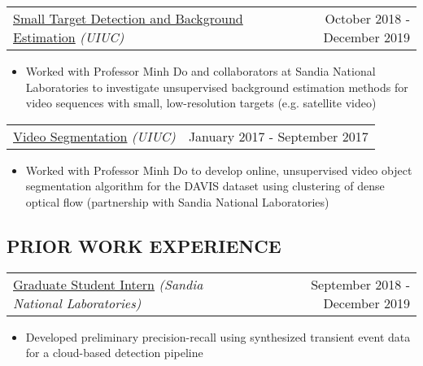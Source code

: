 \documentclass[10pt, letterpaper]{article}
\makeatletter
\newcommand{\headerrow}[2]
{\begin{tabular*}{\linewidth}{l@{\extracolsep{\fill}}r}
	#1 &
	#2 \\
\end{tabular*}}
\newcommand{\sansserif}{\cabin}
\makeatother
\begin{document}
\headerrow
	{\uline{Small Target Detection and Background Estimation} \textit{(UIUC)}}
	{October 2018 - December 2019}
	\begin{itemize}
		\item
			Worked with Professor Minh Do and collaborators at
			Sandia National Laboratories to investigate unsupervised
			background estimation methods for video sequences with
			small, low-resolution targets (e.g. satellite video)
	\end{itemize}

\headerrow
	{\uline{Video Segmentation} \textit{(UIUC)}}
	{January 2017 - September 2017}
	\begin{itemize}
		\item
		Worked with Professor Minh Do to develop online, unsupervised video object segmentation algorithm for the DAVIS dataset using clustering of dense optical flow (partnership with Sandia National Laboratories)	
	\end{itemize}

	\begin{comment}
\headerrow
	{\uline{VLSI Design and Evaluation of a Massive MIMO Detection Algorithm} \textit{(UMN)}}
	{September 2015 - May 2016}
	\begin{itemize}
		\item
		Worked with Professor Gerald Sobelman on surveying and evaluating proposed massive MIMO detection algorithms and implementing one in Verilog for VLSI (project for Honors Thesis) 
	\end{itemize}
	\end{comment}


\subsection*{\sansserif PRIOR WORK EXPERIENCE}

\headerrow
	{\uline{Graduate Student Intern} \textit{(Sandia National Laboratories)}}
	{September 2018 - December 2019}
		\begin{itemize}
			\begin{comment}
			\item Member of the Sensor Specific Processing team
				working on the transient detection pipeline
			\item Developed transient event data simulator with
				ground truth for multiple profiles
			\item Developed preliminary precision-recall
				testing with synthesized data for cloud-based
				detection pipeline
			\item Investigated unsupervised background estimation
				for small moving targets
			\end{comment}
			\item Developed preliminary precision-recall using
				synthesized transient event data for a
				cloud-based detection pipeline
		\end{itemize}
\end{document}
